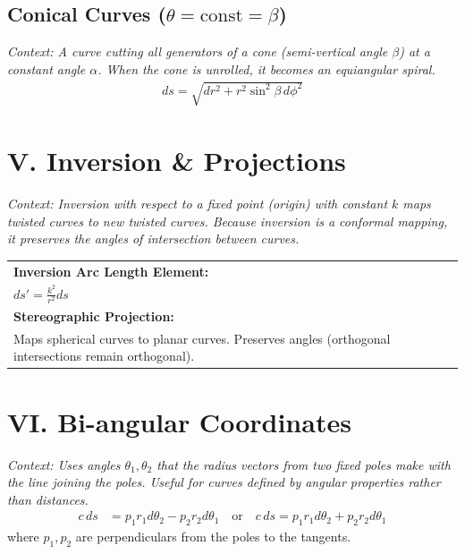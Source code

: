 \documentclass[11pt, a4paper]{article}
\begin{document}
\subsection*{\color{secondary} Conical Curves ($\theta = \text{const} = \beta$)}
\textit{\small Context: A curve cutting all generators of a cone (semi-vertical angle $\beta$) at a constant angle $\alpha$. When the cone is unrolled, it becomes an equiangular spiral.}
\begin{align*}
    ds = \sqrt{dr^2 + r^2 \sin^2\beta \, d\phi^2}
\end{align*}

\section*{\color{primary} V. Inversion \& Projections}

\textit{\small Context: Inversion with respect to a fixed point (origin) with constant $k$ maps twisted curves to new twisted curves. Because inversion is a conformal mapping, it preserves the angles of intersection between curves.}

\begin{center}
\begin{tabular}{@{}p{}@{}}
\toprule
\textbf{\color{accent}Inversion Arc Length Element:} \\
$ds' = \frac{k^2}{r^2} ds$ \\
\midrule
\textbf{\color{accent}Stereographic Projection:} \\
Maps spherical curves to planar curves. Preserves angles (orthogonal intersections remain orthogonal). \\
\bottomrule
\end{tabular}
\end{center}

\vspace{0.3cm}

\section*{\color{primary} VI. Bi-angular Coordinates}

\textit{\small Context: Uses angles $\theta_1, \theta_2$ that the radius vectors from two fixed poles make with the line joining the poles. Useful for curves defined by angular properties rather than distances.}
\begin{align*}
    c \, ds &= p_1 r_1 d\theta_2 - p_2 r_2 d\theta_1 \quad \text{or} \quad c \, ds = p_1 r_1 d\theta_2 + p_2 r_2 d\theta_1
\end{align*}
where $p_1, p_2$ are perpendiculars from the poles to the tangents.
\end{document}
